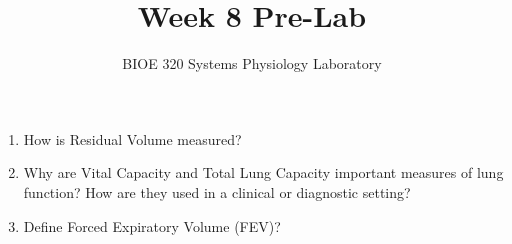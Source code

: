 \documentclass{article}
\title{Week 8 Pre-Lab}
\author{BIOE 320 Systems Physiology Laboratory}
\date{}
\begin{document}
\maketitle
\large

\begin{enumerate}
	\item How is Residual Volume measured?
	\item Why are Vital Capacity and Total Lung Capacity important measures of lung function? How are they used in a clinical or diagnostic setting?
	\item Define Forced Expiratory Volume (FEV)?
\end{enumerate}
\end{document}

